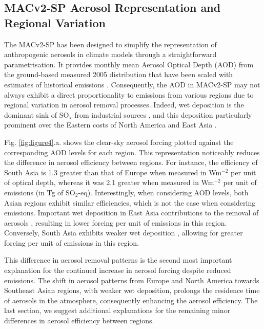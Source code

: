 \documentclass[draft]{agujournal2019}
\begin{document}
      \subsection{MACv2-SP Aerosol Representation and Regional Variation}
            The MACv2-SP has been designed to simplify the representation of anthropogenic aerosols in climate models through a straightforward parametrisation. 
            It provides monthly mean Aerosol Optical Depth (AOD) from the ground-based measured 2005 distribution that have been scaled with estimates of historical emissions \cite{Stevens_2017}. 
            Consequently, the AOD in MACv2-SP may not always exhibit a direct proportionality to emissions from various regions due to regional variation in aerosol removal processes. Indeed, wet deposition is the dominant sink of SO$_{\textrm{x}}$ from industrial sources \cite{Textor_2006}, and this deposition particularly prominent over the Eastern costs of North America and East Asia \cite{Rodhe_2002}.

            Fig. \ref{fig:figure4}.a. shows the clear-sky aerosol forcing plotted against the corresponding AOD levels for each region. This representation noticeably reduces the difference in aerosol efficiency between regions. For instance, the efficiency of South Asia is 1.3 greater than that of Europe when measured in Wm$^{-2}$ per unit of optical depth, whereas it was 2.1 greater when measured in Wm$^{-2}$ per unit of emissions (in Tg of SO$_2$-eq).
            Interestingly, when considering AOD levels, both Asian regions exhibit similar efficiencies, which is not the case when considering emissions. 
            Important wet deposition in East Asia contributions to the removal of aerosols \cite{Rodhe_2002}, resulting in lower forcing per unit of emissions in this region. Conversely, South Asia exhibits weaker wet deposition \cite{Rodhe_2002}, allowing for greater forcing per unit of emissions in this region.

            This difference in aerosol removal patterns is the second most important explanation for the continued increase in aerosol forcing despite reduced emissions. The shift in aerosol patterns from Europe and North America towards Southeast Asian regions, with weaker wet deposition, prolongs the residence time of aerosols in the atmosphere, consequently enhancing the aerosol efficiency.
            The last section, we suggest additional explanations for the remaining minor differences in aerosol efficiency between regions.
\end{document}
